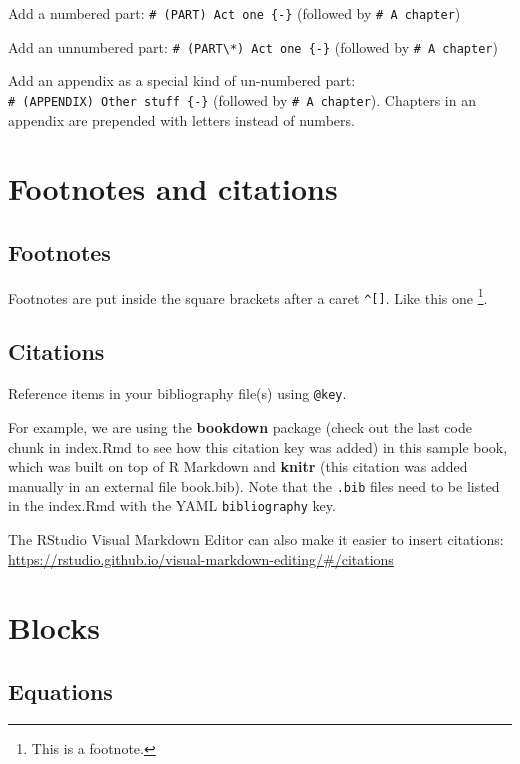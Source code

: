 \documentclass[
]{book}
\theoremstyle{definition}
\theoremstyle{definition}
\theoremstyle{definition}
\theoremstyle{definition}
\theoremstyle{remark}
\begin{document}
Add a numbered part: \texttt{\#\ (PART)\ Act\ one\ \{-\}} (followed by \texttt{\#\ A\ chapter})

Add an unnumbered part: \texttt{\#\ (PART\textbackslash{}*)\ Act\ one\ \{-\}} (followed by \texttt{\#\ A\ chapter})

Add an appendix as a special kind of un-numbered part: \texttt{\#\ (APPENDIX)\ Other\ stuff\ \{-\}} (followed by \texttt{\#\ A\ chapter}). Chapters in an appendix are prepended with letters instead of numbers.

\hypertarget{footnotes-and-citations}{%
\chapter{Footnotes and citations}\label{footnotes-and-citations}}

\hypertarget{footnotes}{%
\section{Footnotes}\label{footnotes}}

Footnotes are put inside the square brackets after a caret \texttt{\^{}{[}{]}}. Like this one \footnote{This is a footnote.}.

\hypertarget{citations}{%
\section{Citations}\label{citations}}

Reference items in your bibliography file(s) using \texttt{@key}.

For example, we are using the \textbf{bookdown} package \citep{R-bookdown} (check out the last code chunk in index.Rmd to see how this citation key was added) in this sample book, which was built on top of R Markdown and \textbf{knitr} \citep{xie2015} (this citation was added manually in an external file book.bib).
Note that the \texttt{.bib} files need to be listed in the index.Rmd with the YAML \texttt{bibliography} key.

The RStudio Visual Markdown Editor can also make it easier to insert citations: \url{https://rstudio.github.io/visual-markdown-editing/\#/citations}

\hypertarget{blocks}{%
\chapter{Blocks}\label{blocks}}

\hypertarget{equations}{%
\section{Equations}\label{equations}}
\end{document}
